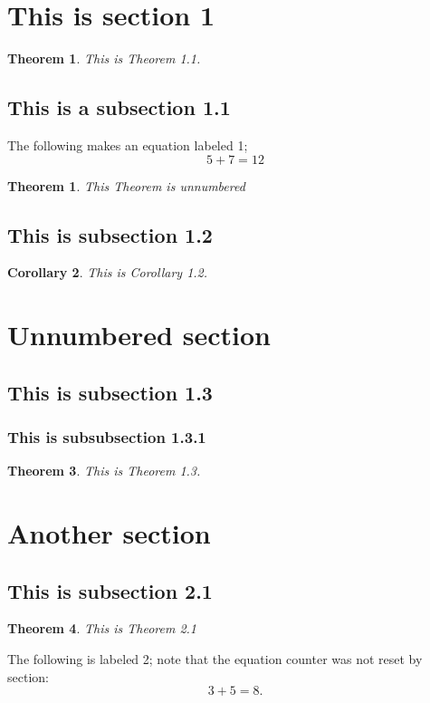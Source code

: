 \documentclass{amsart}
\theoremstyle{plain}
\newtheorem*{theorem*}{Theorem}
\newtheorem{theorem}{Theorem}
\newtheorem{corollary}[theorem]{Corollary}
\theoremstyle{definition}
\theoremstyle{remark}
\numberwithin{theorem}{section}
\begin{document}
\section{This is section 1}

\begin{theorem}
This is Theorem 1.1.
\end{theorem}

\subsection{This is a subsection 1.1}

The following makes an equation labeled 1; 
\begin{equation}
5 + 7 = 12
\end{equation}

\begin{theorem*}
This Theorem is unnumbered
\end{theorem*}

\subsection{This is subsection 1.2}

\begin{corollary}
This is Corollary 1.2.
\end{corollary}

\section*{Unnumbered section}

\subsection{This is subsection 1.3}
\subsubsection{This is subsubsection 1.3.1}

\begin{theorem}
This is Theorem 1.3.
\end{theorem}


\section{Another section}

\subsection{This is subsection 2.1}

\begin{theorem}
This is Theorem 2.1
\end{theorem}

The following is labeled 2; note that the equation counter was not reset by section:
\begin{equation}
3+5 = 8.
\end{equation}
\end{document}
